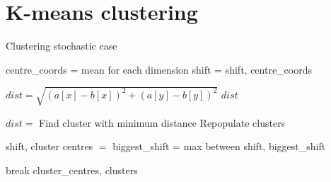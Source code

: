\section{K-means clustering}
\begin{algorithm}
\label{alg:KMeans}
\caption{Clustering stochastic case}
 \begin{algorithmic}[1]
    \Statex
    
    
    	\Statex
    		\State centre\_coords =  mean for each dimension
    		\State shift = 
    		\State \Return shift, centre\_coords
    	\EndFunction
    
    	\Statex
    		\State $dist = \sqrt{(a[x] - b[x])^2+(a[y] - b[y])^2}$
    		\State \Return $dist$
    	\EndFunction
      
      	\Statex
      				\State $dist = $
      			\EndFor
      			\State Find cluster with minimum distance
      			\State Repopulate clusters
      		\EndFor
      		
      			\State shift, cluster centres $=$ 
      			\State biggest\_shift =  max between shift, biggest\_shift
      			
      		\EndFor
      			\State break
      		\EndIf
      	\EndWhile
      \State \Return cluster\_centres, clusters
    \EndFunction

  \end{algorithmic}
\end{algorithm}
%
%
%
%
%
%
